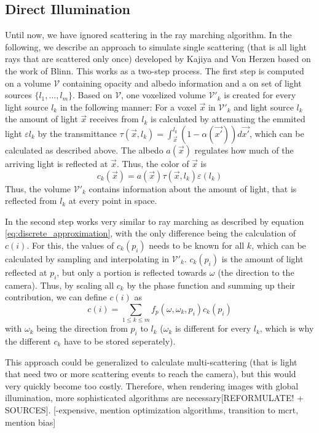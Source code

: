 \subsection{Direct Illumination}
Until now, we have ignored scattering in the ray marching algorithm. In the following, we describe an approach to simulate single scattering (that is all light rays that are scattered only once) developed by Kajiya and Von Herzen\cite{10.1145/964965.808594} based on the work of Blinn\cite{10.1145/965145.801255}.
This works as a two-step process.
The first step is computed on a volume $\mathcal{V}$ containing opacity and albedo information and a on set of light sources $\{l_1, \ldots, l_m\}$.
Based on $\mathcal{V}$, one voxelized volume $\mathcal{V'}_k$ is created for every light source $l_k$ in the following manner:
For a voxel $\vec{x}$ in $\mathcal{V'}_k$ and light source $l_k$ the amount of light $\vec{x}$ receives from $l_k$ is calculated by attenuating the emmited light $\varepsilon{l_k}$ by the transmittance $\tau(\vec{x}, l_k) = \int_{\vec{x}}^{l_k}(1 - \alpha(\vec{x'}))d\vec{x'}$, which can be calculated as described above.
 The albedo $a(\vec{x})$ regulates how much of the arriving light is reflected at $\vec{x}$. Thus, the color of $\vec{x}$ is
\begin{equation}
c_k(\vec{x}) = a(\vec{x}) \tau(\vec{x}, l_k) \varepsilon(l_k)
\end{equation}
Thus, the volume $\mathcal{V'}_k$ contains information about the amount of light, that is reflected from $l_k$ at every point in space.

In the second step works very similar to ray marching as described by equation \ref{eq:discrete_approximation}, with the only difference being the calculation of $c(i)$. For this, the values of $c_k(p_i)$ needs to be known for all $k$, which can be calculated by sampling and interpolating in $\mathcal{V'}_k$.
$c_k(p_i)$ is the amount of light reflected at $p_i$, but only a portion is reflected towards $\omega$ (the direction to the camera). Thus, by scaling all $c_k$ by the phase function and summing up their contribution, we can define $c(i)$ as
\begin{equation}
c(i) = \sum_{1 \le k \le m} f_p(\omega, \omega_k, p_i)c_k(p_i)
\end{equation}
with $\omega_k$ being the direction from $p_i$ to $l_k$ ($\omega_k$ is different for every $l_k$, which is why the different $c_k$ have to be stored seperately).

This approach could be generalized to calculate multi-scattering (that is light that need two or more scattering events to reach the camera), but this would very quickly become too costly. Therefore, when rendering images with global illumination, more sophisticated algorithms are necessary[REFORMULATE! + SOURCES].
[-expensive, mention optimization algorithms, transition to mcrt, mention bias]
